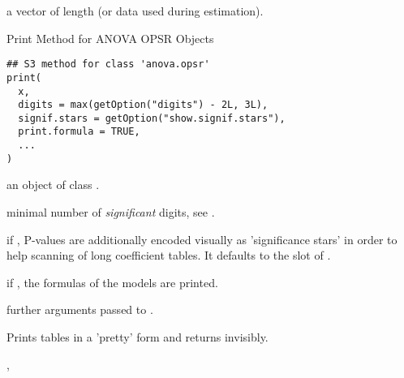 %
\begin{Value}
a vector of length  (or data used during estimation).
\end{Value}
%
\begin{SeeAlso}
\end{SeeAlso}
%
\begin{Examples}
\end{Examples}


%
\begin{Description}
Print Method for ANOVA OPSR Objects
\end{Description}
%
\begin{Usage}
\begin{verbatim}
## S3 method for class 'anova.opsr'
print(
  x,
  digits = max(getOption("digits") - 2L, 3L),
  signif.stars = getOption("show.signif.stars"),
  print.formula = TRUE,
  ...
)
\end{verbatim}
\end{Usage}
%
\begin{Arguments}
\begin{ldescription}
\item[\code{x}] an object of class .

\item[\code{digits}] minimal number of \emph{significant} digits, see .

\item[\code{signif.stars}] if , P-values are additionally encoded visually
as 'significance stars' in order to help scanning of long coefficient tables.
It defaults to the  slot of .

\item[\code{print.formula}] if , the formulas of the models are printed.

\item[\code{...}] further arguments passed to .
\end{ldescription}
\end{Arguments}
%
\begin{Value}
Prints tables in a 'pretty' form and returns  invisibly.
\end{Value}
%
\begin{SeeAlso}
, 
\end{SeeAlso}

